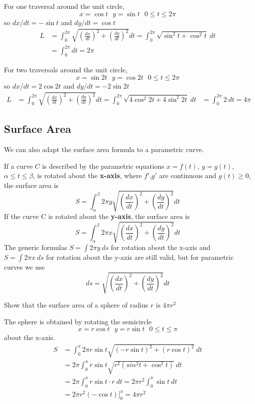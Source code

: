     \begin{solution}
      For one traversal around the unit circle,
      $$ x=\cos t \ \ \ y=\sin t \ \ \ 0\leq t\leq 2\pi$$
      so $dx/dt = -\sin t$ and $dy/dt = \cos t$
      \begin{align*}
        L &= \int_{0}^{2\pi}\sqrt{\left(\frac{dx}{dt}\right)^2+\left(\frac{dy}{dt}\right)^2} dt = \int_{0}^{2\pi}\sqrt{\sin^2 t + \cos^2 t}\ dt \\
          &= \int_{0}^{2\pi}dt = 2\pi
      \end{align*}

      For two traversals around the unit circle,
      $$ x=\sin 2t \ \ \ y=\cos 2t \ \ \ 0\leq t\leq 2\pi$$
      so $dx/dt = 2\cos 2t$ and $dy/dt = -2\sin 2t$
      \begin{align*}
        L &= \int_{0}^{2\pi}\sqrt{\left(\frac{dx}{dt}\right)^2+\left(\frac{dy}{dt}\right)^2} dt = \int_{0}^{2\pi}\sqrt{4\cos^2 2t + 4\sin^2 2t}\ dt
          &= \int_{0}^{2\pi}2\ dt = 4\pi
      \end{align*}
    \end{solution}
  \subsection*{Surface Area}
    We can also adapt the surface area formula to a parametric curve.
    \begin{definition}
      If a curve $C$ is described by the parametric equations $x=f(t)$, $y=g(t)$, $\alpha \leq t \leq \beta$, is rotated about the \textbf{x-axis}, where $f'$,$g'$ are continuous and $g(t)\geq 0$, the surface area is
        $$ S=\int_{\alpha}^{\beta} 2\pi y \sqrt{\left(\frac{dx}{dt}\right)^2+\left(\frac{dy}{dt}\right)^2} dt  $$
      If the curve C is rotated about the \textbf{y-axis}, the surface area is
        $$ S=\int_{\alpha}^{\beta} 2\pi x \sqrt{\left(\frac{dx}{dt}\right)^2+\left(\frac{dy}{dt}\right)^2} dt  $$
      The generic formulas ${S=\int 2\pi y\ ds}$ for rotation about the x-axis and ${S=\int 2\pi x\ ds}$ for rotation about the y-axis are still valid, but for parametric curves we use
        $$ds = \sqrt{\left(\frac{dx}{dt}\right)^2+\left(\frac{dy}{dt}\right)^2} dt$$
    \end{definition}
    \begin{example}
      Show that the surface area of a sphere of radius $r$ is $4\pi r^2$
    \end{example}
    \begin{solution}
      The sphere is obtained by rotating the semicircle
        $$x=r\cos t \ \ \ y=r\sin t \ \ \ 0 \leq t \leq \pi$$
      about the x-axis.
      \begin{align*}
        S &= \int_{0}^{\pi} 2\pi r\sin t\sqrt{(-r\sin t)^2 + (r\cos t)^2}\ dt \\
          &= 2\pi\int_{0}^{\pi} r \sin t\sqrt{r^2 (sin^2 t + \cos^2 t)}\ dt \\
          &= 2\pi\int_{0}^{\pi} r \sin t \cdot r\ dt = 2\pi r^2\int_{0}^{\pi}\sin t\ dt \\
          &= 2\pi r^2 (-\cos t)]_{0}^{\pi} = 4\pi r^2
      \end{align*}
    \end{solution}

